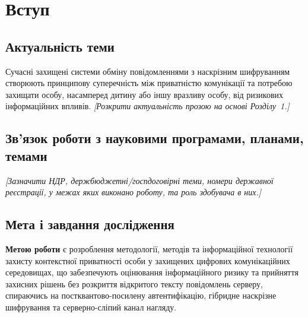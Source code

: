 \chapter*{Вступ}


\section*{Актуальність теми}

Сучасні захищені системи обміну повідомленнями з наскрізним шифруванням створюють принципову суперечність між приватністю комунікації та потребою захищати особу, насамперед дитину або іншу вразливу особу, від ризикових інформаційних впливів. \emph{[Розкрити актуальність прозою на основі Розділу~1.]}

\section*{Зв'язок роботи з науковими програмами, планами, темами}

\emph{[Зазначити НДР, держбюджетні/госпдоговірні теми, номери державної реєстрації, у межах яких виконано роботу, та роль здобувача в них.]}

\section*{Мета і завдання дослідження}

\textbf{Метою роботи} є розроблення методології, методів та інформаційної технології захисту контекстної приватності особи у захищених цифрових комунікаційних середовищах, що забезпечують оцінювання інформаційного ризику та прийняття захисних рішень без розкриття відкритого тексту повідомлень серверу, спираючись на постквантово-посилену автентифікацію, гібридне наскрізне шифрування та серверно-сліпий канал нагляду.

